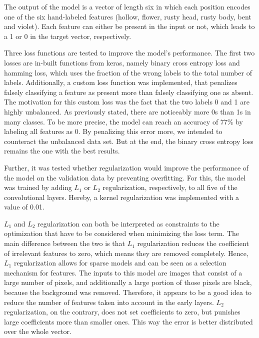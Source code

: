 The output of the model is a vector of length six in which each position encodes one of the six hand-labeled features (hollow, flower, rusty head, rusty body, bent and violet). Each feature can either be present in the input or not, which leads to a 1 or 0 in the target vector, respectively.

Three loss functions are tested to improve the model's performance. The first two losses are in-built functions from keras, namely binary cross entropy loss and hamming loss, which uses the fraction of the wrong labels to the total number of labels. Additionally, a custom loss function was implemented, that penalizes falsely classifying a feature as present more than falsely classifying one as absent. The motivation for this custom loss was the fact that the two labels 0 and 1 are highly unbalanced. As previously stated, there are noticeably more 0s than 1s in many classes. To be more precise, the model can reach an accuracy of 77\% by labeling all features as 0. By penalizing this error more, we intended to counteract the unbalanced data set. But at the end, the binary cross entropy loss remains the one with the best results.

Further, it was tested whether regularization would improve the performance of the model on the validation data by preventing overfitting. For this, the model was trained by adding \(L_1\) or \(L_2\) regularization, respectively, to all five of the convolutional layers.  Hereby, a kernel regularization was implemented with a value of 0.01.

\(L_1\) and \(L_2\) regularization can both be interpreted as constraints to the optimization that have to be considered when minimizing the loss term. The main difference between the two is that \(L_1\) regularization reduces the coefficient of irrelevant features to zero, which means they are removed completely. Hence, \(L_1\) regularization allows for sparse models and can be seen as a selection mechanism for features. The inputs to this model are images that consist of a large number of pixels, and additionally a large portion of those pixels are black, because the background was removed. Therefore, it appears to be a good idea to reduce the number of features taken into account in the early layers. \(L_2\) regularization, on the contrary, does not set coefficients to zero, but punishes large coefficients more than smaller ones. This way the error is better distributed over the whole vector.

